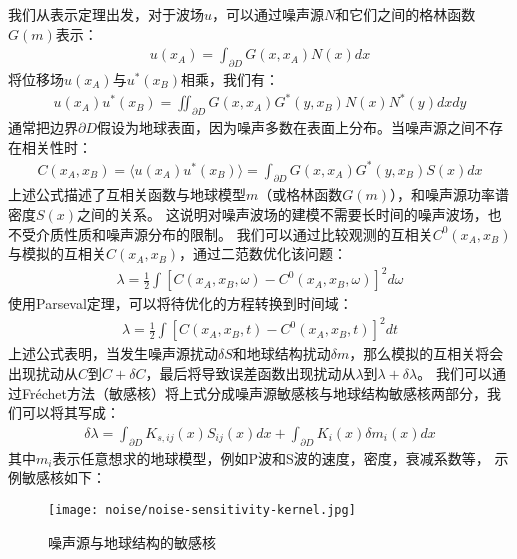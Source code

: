 我们从表示定理出发，对于波场$u$，可以通过噪声源$N$和它们之间的格林函数$G(m)$表示：
\begin{align}
    u(x_A) = \int\nolimits_{\partial D} G(x,x_A) N(x) dx
    \label{equ:u-rp}
\end{align}
将位移场$u(x_A)$与$u^*(x_B)$相乘，我们有：
\begin{align}
    u(x_A) u^*(x_B) = \iint\nolimits_{\partial D} G(x,x_A) G^*(y,x_B) N(x) N^*(y) dx dy
    \label{equ:cc-rp}
\end{align}
通常把边界$\partial D$假设为地球表面，因为噪声多数在表面上分布。当噪声源之间不存在相关性时：
\begin{align}
    C(x_A,x_B) = \langle  u(x_A) u^*(x_B)\rangle  = \int\nolimits_{\partial D} G(x,x_A) G^*(y,x_B) S(x) dx
    \label{equ:cc-rp-ave}
\end{align}
上述公式描述了互相关函数与地球模型$m$（或格林函数$G(m)$），和噪声源功率谱密度$S(x)$之间的关系。
这说明对噪声波场的建模不需要长时间的噪声波场，也不受介质性质和噪声源分布的限制。
我们可以通过比较观测的互相关$C^0(x_A,x_B)$与模拟的互相关$C(x_A,x_B)$，通过二范数优化该问题：
\begin{align}
    \lambda = \frac{1}{2} \int {[ C(x_A,x_B,\omega) - C^0(x_A,x_B,\omega) ]}^2 d\omega 
    \label{equ:cc-rp-misfit-freq}
\end{align}
使用Parseval定理，可以将待优化的方程转换到时间域：
\begin{align}
    \lambda = \frac{1}{2} \int {[ C(x_A,x_B,t) - C^0(x_A,x_B,t) ]}^2 dt
    \label{equ:cc-rp-misfit-time}
\end{align}
上述公式表明，当发生噪声源扰动$\delta S$和地球结构扰动$\delta m$，那么模拟的互相关将会出现扰动从$C$到$C+\delta C$，最后将导致误差函数出现扰动从$\lambda $到$\lambda +\delta \lambda $。
我们可以通过Fréchet方法（敏感核）将上式分成噪声源敏感核与地球结构敏感核两部分，我们可以将其写成：
\begin{align}
    \delta \lambda =  \int\nolimits_{\partial D} K_{s,ij}(x) S_{ij}(x) dx 
    + \int\nolimits_{\partial D} K_{i}(x) \delta m_i(x)  dx
    \label{equ:no-cc-misfit}
\end{align}
其中$m_i$表示任意想求的地球模型，例如P波和S波的速度，密度，衰减系数等，
示例敏感核如下：

\begin{figure}[h]
    \centering
    \texttt{[image: noise/noise-sensitivity-kernel.jpg]}
    \caption{噪声源与地球结构的敏感核}
    \label{fig:noise-sensitivity-kernel}
\end{figure}

